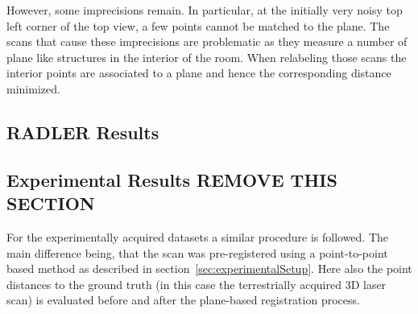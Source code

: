 However, some imprecisions remain. 
In particular, at the initially very noisy top left corner of the top view, a few points cannot be matched to the plane. 
The scans that cause these imprecisions are problematic as they measure a number of plane like structures in the interior of the room. 
When relabeling those scans the interior points are associated to a plane and hence the corresponding distance minimized. 


\iffalse
\subsection{RADLER Results}

\subsection{Experimental Results REMOVE THIS SECTION}

For the experimentally acquired datasets a similar procedure is followed. 
The main difference being, that the scan was pre-registered using a point-to-point based method as described in section~\ref{sec:experimentalSetup}. 
Here also the point distances to the ground truth (in this case the terrestrially acquired 3D laser scan) is evaluated before and after the plane-based registration process. 

